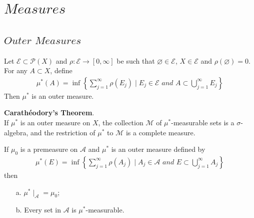 \ifx\allfiles\undefined


	\else
	\fi
\chapter{$Measures$}

\newpage
\setcounter{section}{3}
\section{$Outer \,\, Measures$}
	\begin{proposition}\label{prop 2.4.1}
		Let $\mathcal{E} \subset \mathcal{P}(X)$ and $\rho : \mathcal{E} \rightarrow [0 , \infty]$ be such that $\varnothing \in \mathcal{E}$, $X \in \mathcal{E}$ and $\rho(\varnothing) = 0$. For any $A \subset X$, define
		\begin{align}
			\mu^{*}(A) = \inf{\left\{ \sum_{j = 1}^{\infty}{\rho(E_j)} \mid E_j \in \mathcal{E} \,\, and \,\, A \subset \bigcup_{j = 1}^{\infty}{E_j} \right\}}
		\end{align}
		Then $\mu^{*}$ is an outer measure.
	\end{proposition}
	
	\vspace*{10em}
	
	\begin{thm}\label{thm 2.4.1}
		\textbf{Carath\'{e}odory's Theorem}. \\
		If $\mu^{*}$ is an outer measure on $X$, the collection $\mathcal{M}$ of $\mu^{*}$-measurable sets is a $\sigma$-algebra, and the restriction of $\mu^{*}$ to $\mathcal{M}$ is a complete measure.
	\end{thm}
	
	\vspace*{10em}
	
	\begin{proposition}\label{prop 2.4.2}
		If $\mu_0$ is a premeasure on $\mathcal{A}$ and $\mu^{*}$ is an outer measure defined by
		\begin{align}
			\mu^{*}(E) = \inf{\left\{ \sum_{j = 1}^{\infty}{\rho(A_j)} \mid A_j \in \mathcal{A} \,\, and \,\, E \subset \bigcup_{j = 1}^{\infty}{A_j} \right\}}
		\end{align}
		then
		\begin{enumerate}
			\item[a.] $\mu^{*} \mid_\mathcal{A} = \mu_0$;
			
			\item[b.] Every set in $\mathcal{A}$ is $\mu^{*}$-measurable.
		\end{enumerate}
	\end{proposition}
	
